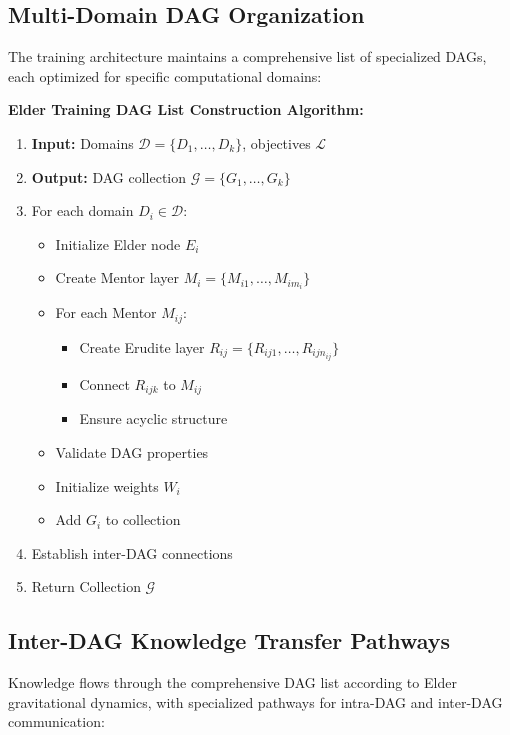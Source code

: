 \subsection{Multi-Domain DAG Organization}

The training architecture maintains a comprehensive list of specialized DAGs, each optimized for specific computational domains:

\textbf{Elder Training DAG List Construction Algorithm:}
\begin{enumerate}
\item \textbf{Input:} Domains $\mathcal{D} = \{D_1, \ldots, D_k\}$, objectives $\mathcal{L}$
\item \textbf{Output:} DAG collection $\mathcal{G} = \{G_1, \ldots, G_k\}$
\item For each domain $D_i \in \mathcal{D}$:
    \begin{itemize}
    \item Initialize Elder node $E_i$
    \item Create Mentor layer $M_i = \{M_{i1}, \ldots, M_{im_i}\}$
    \item For each Mentor $M_{ij}$:
        \begin{itemize}
        \item Create Erudite layer $R_{ij} = \{R_{ij1}, \ldots, R_{ijn_{ij}}\}$
        \item Connect $R_{ijk}$ to $M_{ij}$
        \item Ensure acyclic structure
        \end{itemize}
    \item Validate DAG properties
    \item Initialize weights $W_i$
    \item Add $G_i$ to collection
    \end{itemize}
\item Establish inter-DAG connections
\item Return Collection $\mathcal{G}$
\end{enumerate}

\subsection{Inter-DAG Knowledge Transfer Pathways}

Knowledge flows through the comprehensive DAG list according to Elder gravitational dynamics, with specialized pathways for intra-DAG and inter-DAG communication:


